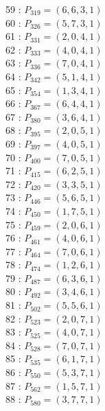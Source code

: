 \documentclass{article}
\begin{document}
{\begin{multicols}{3}
59 : $P_{319}=( 6, 6, 3, 1 )$\\
60 : $P_{326}=( 5, 7, 3, 1 )$\\
61 : $P_{331}=( 2, 0, 4, 1 )$\\
62 : $P_{333}=( 4, 0, 4, 1 )$\\
63 : $P_{336}=( 7, 0, 4, 1 )$\\
64 : $P_{342}=( 5, 1, 4, 1 )$\\
65 : $P_{354}=( 1, 3, 4, 1 )$\\
66 : $P_{367}=( 6, 4, 4, 1 )$\\
67 : $P_{380}=( 3, 6, 4, 1 )$\\
68 : $P_{395}=( 2, 0, 5, 1 )$\\
69 : $P_{397}=( 4, 0, 5, 1 )$\\
70 : $P_{400}=( 7, 0, 5, 1 )$\\
71 : $P_{415}=( 6, 2, 5, 1 )$\\
72 : $P_{420}=( 3, 3, 5, 1 )$\\
73 : $P_{446}=( 5, 6, 5, 1 )$\\
74 : $P_{450}=( 1, 7, 5, 1 )$\\
75 : $P_{459}=( 2, 0, 6, 1 )$\\
76 : $P_{461}=( 4, 0, 6, 1 )$\\
77 : $P_{464}=( 7, 0, 6, 1 )$\\
78 : $P_{474}=( 1, 2, 6, 1 )$\\
79 : $P_{487}=( 6, 3, 6, 1 )$\\
80 : $P_{492}=( 3, 4, 6, 1 )$\\
81 : $P_{502}=( 5, 5, 6, 1 )$\\
82 : $P_{523}=( 2, 0, 7, 1 )$\\
83 : $P_{525}=( 4, 0, 7, 1 )$\\
84 : $P_{528}=( 7, 0, 7, 1 )$\\
85 : $P_{535}=( 6, 1, 7, 1 )$\\
86 : $P_{550}=( 5, 3, 7, 1 )$\\
87 : $P_{562}=( 1, 5, 7, 1 )$\\
88 : $P_{580}=( 3, 7, 7, 1 )$\\
\end{multicols}


%


%


}%
\end{document}
